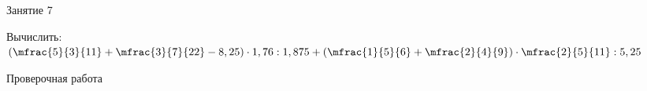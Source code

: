 \begin{class}[number=7]
	\begin{listofex}
		\item Занятие 7
	\end{listofex}
\end{class}

\begin{homework}[number=3]
	\begin{listofex}
		\item Вычислить: \( \left( \mfrac{5}{3}{11} + \mfrac{3}{7}{22} - 8,25 \right) \cdot 1,76 : 1,875 + \left( \mfrac{1}{5}{6} + \mfrac{2}{4}{9} \right) \cdot \mfrac{2}{5}{11} : 5,25 \)
	\end{listofex}
\end{homework}

\begin{exam}
	\begin{listofex}
		\item Проверочная работа
	\end{listofex}
\end{exam}

